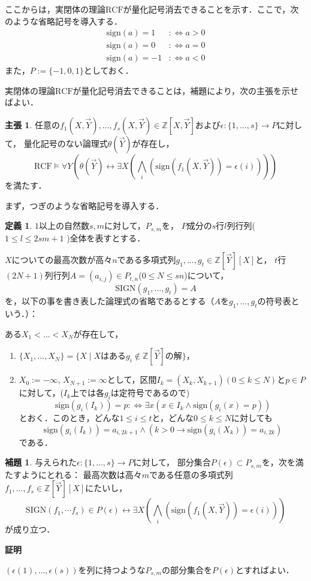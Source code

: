 \documentclass[uplatex, dvipdfmx]{jsarticle}
\makeatletter
\renewenvironment{proof}[1][\proofname]{\par
  \pushQED{\qed}%
  \normalfont \topsep6\p@\@plus6\p@\relax
  \trivlist
  \item\relax
  {\bfseries
  #1\@addpunct{.}}\hspace\labelsep\ignorespaces
}{%
  \popQED\endtrivlist\@endpefalse
}
\newcommand{\sign}{\mathrm{sign}}
\newcommand{\SIGN}{\mathrm{SIGN}}
\newcommand{\defiff}{:\Leftrightarrow}
\newcommand{\RCF}{\mathrm{RCF}}
\newcommand{\Z}{\mathbb{Z}}
\newcommand{\map}[3]{{#1}:{#2}\rightarrow{#3}}
\theoremstyle{definition}
\newtheorem{definition}{定義}[section]
\newtheorem{lemma}{補題}[section]
\newtheorem*{claim*}{主張}
\renewcommand{\proofname}{\textbf{証明}}
\makeatother
\begin{document}
ここからは，実閉体の理論$\RCF$が量化記号消去できることを示す．ここで，次のような省略記号を導入する．
\begin{align*}
    \sign(a) = 1 &\defiff a>0\\
    \sign(a) = 0 &\defiff a=0\\
    \sign(a) = -1 &\defiff a<0
\end{align*}
また，$P:=\{-1,0,1\}$としておく．

実閉体の理論$\RCF$が量化記号消去できることは，補題により，次の主張を示せばよい．
\begin{claim*}
    任意の$f_1(X,\vec{Y}), \dots, f_s(X,\vec{Y}) \in \Z[X,\vec{Y}]$および$\map{\epsilon}{\{1,\dots,s\}}{P}$に対して，
    量化記号のない論理式$\theta(\vec{Y})$が存在し，
    \[
        \RCF \models \forall Y (\theta(\vec{Y}) \leftrightarrow \exists X (\bigwedge_i(\sign(f_1(X,\vec{Y}))=\epsilon(i))))
    \]
    を満たす．
\end{claim*}

まず，つぎのような省略記号を導入する．
\begin{definition}
    $1$以上の自然数$s,m$に対して，$P_{s,m}$を，
    $P$成分の$s$行$l$列行列( $1 \leq l \leq 2sm+1$ )全体を表すとする．

    $X$についての最高次数が高々$n$である多項式列$g_1,\dots,g_t \in \Z[\vec{Y}][X]$と，
    $t$行$(2N+1)$列行列$A=(a_{i,j}) \in P_{t,n}$($0 \leq N \leq sn$)について，
    \[
        \SIGN(g_1, \dots, g_t) = A
    \]
    を，以下の事を書き表した論理式の省略であるとする（$A$を$g_1,\dots,g_t$の符号表という．）：

    ある$X_1<\dots<X_N$が存在して，
    \begin{enumerate}
        \item $\{X_1, \dots, X_N\} = \{X \mid \text{$X$はある$g_i \notin \Z[\vec{Y}]の解$}\}$，
        \item $X_0 := -\infty$, $X_{N+1} := \infty$として，区間$I_k = (X_k, X_{k+1}) (0 \leq k \leq N)$と$p \in P$に対して，($I_k$上では各$g_i$は定符号であるので)
        \[
            \sign(g_i(I_k))=p \defiff \exists x (x \in I_k \land \sign(g_i(x) = p))
        \]
        とおく．このとき，どんな$1 \leq i \leq t$と，どんな$0 \leq k \leq N$に対しても
        \[
            \sign(g_i(I_k))=a_{i,2k+1} \land (k>0 \rightarrow \sign(g_i(X_k))=a_{i,2k})
        \]
        である．
    \end{enumerate}
\end{definition}

\begin{lemma}\label{simplify}
    与えられた$\map{\epsilon}{\{1,\dots,s\}}{P}$に対して，
    部分集合$P(\epsilon) \subset P_{s,m}$を，次を満たすようにとれる：
    最高次数は高々$m$である任意の多項式列$f_1, \dots, f_s \in \Z[\vec{Y}][X]$にたいし，
    \[
    \SIGN(f_1, \dotsm f_s) \in P(\epsilon) 
    \leftrightarrow \exists X (\bigwedge_i(\sign(f_1(X,\vec{Y}))=\epsilon(i)))
    \]
    が成り立つ．
\end{lemma}
\begin{proof}
    $(\epsilon(1),\dots,\epsilon(s))$を列に持つような$P_{s,m}$の部分集合を$P(\epsilon)$とすればよい．
\end{proof}
\end{document}
